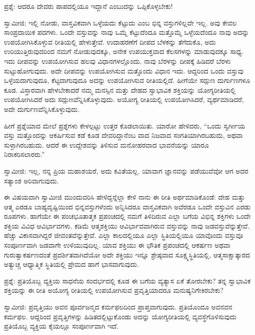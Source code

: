 ಪ್ರಶ್ನೆ: ಆದರೂ ದೇವರು ಪಾಪದಲ್ಲಿಯೂ ಇದ್ದಾನೆ ಎಂಬುದನ್ನು ಒಪ್ಪಿಕೊಳ್ಳಬೇಕು!

ಸ್ವಾಮೀಜಿ: ಇಲ್ಲಿ ನೋಡು, ವಾಸ್ತವಿಕವಾಗಿ ಒಳ್ಳೆಯದು ಕೆಟ್ಟುದು ಎಂಬ ಭಿನ್ನ ವಸ್ತುಗಳಿಲ್ಲವೇ ಇಲ್ಲ. ಅವು ಕೇವಲ ಸಾಂಪ್ರದಾಯಿಕ ಪದಗಳು. ಒಂದೇ ವಸ್ತುವನ್ನು ನಾವು ಒಮ್ಮೆ ಕೆಟ್ಟುದೆಂದೂ ಮತ್ತೊಮ್ಮೆ ಒಳ್ಳೆಯದೆಂದೂ ನಾವು ಅದನ್ನು ಉಪಯೋಗಿಸಿಕೊಳ್ಳುವ ರೀತಿಯಲ್ಲಿ ಹೇಳುತ್ತೇವೆ. ಉದಾಹರಣೆಗೆ ದೀಪದ ಬೆಳಕನ್ನು ತೆಗೆದುಕೊ, ಅದು ಉರಿಯುತ್ತಿರುವುದರಿಂದ ನಮಗೆ ನೋಡುವುದಕ್ಕೂ, ಅನೇಕ ಉಪಯುಕ್ತವಾದ ಕೆಲಸಗಳನ್ನು ಮಾಡುವುದಕ್ಕೂ ಸಾಧ್ಯ. ಇದು ದೀಪವನ್ನು ಉಪಯೋಗಿಸುವ ಹಲವು ವಿಧಾನಗಳಲ್ಲೊಂದು. ನಾವು ಬೆರಳನ್ನು ದೀಪಕ್ಕೆ ಹಿಡಿದರೆ ಬೆರಳು ಸುಟ್ಟುಹೋಗುವುದು. ಅದೇ ದೀಪವನ್ನು ಉಪಯೋಗಿಸುವ ಮತ್ತೊಂದು ವಿಧಾನ ಇದು. ಆದ್ದರಿಂದ ಒಂದು ವಸ್ತುವು ಒಳ್ಳೆಯದಾಗುವುದೂ, ಕೆಟ್ಟದಾಗುವುದೂ ಅದನ್ನು ಉಪಯೋಗಿಸುವ ರೀತಿಯಲ್ಲಿದೆ. ಹೀಗೆಯೇ ಸದ್ಗುಣ ದುರ್ಗುಣಗಳೂ ಕೂಡ. ವಿಸ್ತಾರವಾಗಿ ಹೇಳಬೇಕಾದರೆ ನಮ್ಮ ಮನಸ್ಸಿನ ಮತ್ತು ದೇಹದ ಸ್ವಾಭಾವಿಕ ಶಕ್ತಿಯನ್ನು ಯೋಗ್ಯರೀತಿಯಲ್ಲಿ ಉಪಯೋಗಿಸಿದರೆ ಅದು ಸದ್ಗುಣವೆನ್ನಿಸಿಕೊಳ್ಳುವುದು. ಅಯೋಗ್ಯ ರೀತಿಯಲ್ಲಿ ಉಪಯೋಗಿಸಿದರೆ, ವ್ಯರ್ಥಮಾಡಿದರೆ, ಅದೇ ದುರ್ಗುಣವೆನ್ನಿಸಿಕೊಳ್ಳುವುದು.

ಹೀಗೆ ಪ್ರಶ್ನೆಯಾದ ಮೇಲೆ ಪ್ರಶ್ನೆಗಳು ಕೇಳಲ್ಪಟ್ಟು ಉತ್ತರ ಕೊಡಲಾಯಿತು. ಯಾರೋ ಹೇಳಿದರು, “ಒಂದು ಸ್ವರ್ಗೀಯ ವಸ್ತು ಮತ್ತೊಂದನ್ನು ಆಕರ್ಷಿಸುವ ಕಡೆ ಕೂಡ ದೇವರಿದ್ದಾನೆಂಬ ವಾದ ನಿಜವಾದ ಸಂಗತಿಯಾಗಿರಬಹುದು, ಅಥವಾ ಸುಳ್ಳಾಗಿರಬಹುದು. ಆದರೆ ಈ ಉದ್ದೇಶವನ್ನು ತಿಳಿಸುವ ಮನೋಹರವಾದ ಭಾವನೆಯನ್ನು ಯಾರೂ ನಿರಾಕರಿಸಲಾರರು.”

ಸ್ವಾಮೀಜಿ: ಇಲ್ಲ, ನನ್ನ ಪ್ರಿಯ ಮಹಾಶಯರೆ, ಅದು ಕವಿತೆಯಲ್ಲ. ಯಾವಾಗ ಜ್ಞಾನವನ್ನು ಪಡೆಯುವೆವೋ ಆಗ ಅದರ ಸತ್ಯಾಂಶ ಅರಿವಾಗುವುದು.

ಈ ವಿಷಯವಾಗಿ ಸ್ವಾಮೀಜಿ ಮುಂದುವರಿಸಿ ಹೇಳಿದ್ದನ್ನೆಲ್ಲಾ ಕೇಳಿ ನಾನು ಈ ರೀತಿ ಅರ್ಥಮಾಡಿಕೊಂಡೆ: ದೇಹ ಮತ್ತು ಆತ್ಮ ಎರಡೂ ಬಾಹ್ಯದೃಷ್ಟಿಯಿಂದ ಭಿನ್ನವಸ್ತುಗಳೆಂದು ಅನ್ನಿಸಿದರೂ ವಾಸ್ತವಿಕವಾಗಿ ಅವೆರಡೂ ಒಂದೇ ವಸ್ತುವಿನ ಎರಡು ರೂಪಗಳು. ಹಾಗೆಯೇ ಈ ಪಂಚಭೂತಾತ್ಮಕ ಪ್ರಪಂಚದಲ್ಲಿ ನಮಗೆ ತಿಳಿದಿರುವ ಎಲ್ಲಾ ಬಗೆಯ ವಿಭಿನ್ನ ಶಕ್ತಿಗಳು ಒಂದೇ ಶಕ್ತಿಯ ವಿವಿಧ ಆವಿರ್ಭಾವಗಳು. ಕಡಿಮೆ ಆತ್ಮಶಕ್ತಿಯು ಆವಿರ್ಭಾವವಾಗಿರುವ ವಸ್ತುವನ್ನು ನಾವು ಜಡವಸ್ತುವೆನ್ನುತ್ತೇವೆ. ಹೆಚ್ಚು ವಿಕಾಸವಾಗಿದ್ದರೆ ಜೀವಂತವೆನ್ನುತ್ತೇವೆ. ಎಲ್ಲಾ ಕಾಲದಲ್ಲಿಯೂ ಎಲ್ಲಾ ಸ್ಥಿತಿಯಲ್ಲಿಯೂ ಯಾವೊಂದು ವಸ್ತುವೂ ಸಂಪೂರ್ಣವಾಗಿ ಜಡವಾಗೇ ಉಳಿಯುವುದಿಲ್ಲ. ಯಾವ ಶಕ್ತಿಯು ಈ ಭೌತಿಕ ಪ್ರಪಂಚದಲ್ಲಿ ಆಕರ್ಷಣ ಅಥವಾ ಗುರುತ್ವಾಕರ್ಷಣದಂತೆ ಪ್ರದರ್ಶಿತವಾಗಿದೆಯೋ ಅದೇ ಶಕ್ತಿಯು ಇನ್ನೂ ಶ್ರೇಷ್ಠವಾದ ಸೂಕ್ಷ್ಮಸ್ಥಿತಿಯಲ್ಲಿ, ಆತ್ಮಸಾಕ್ಷಾತ್ಕಾರದ ಅತ್ಯುಚ್ಚ ಆಧ್ಯಾತ್ಮಿಕ ಸ್ಥಿತಿಯಲ್ಲಿ ಪ್ರೇಮದ ಹಾಗೆ ಭಾಸವಾಗುವುದು.

ಪ್ರಶ್ನೆ: ಪ್ರತಿಯೊಬ್ಬ ವ್ಯಕ್ತಿಯ ಸಾಧನೆಯ ಸಂದರ್ಭದಲ್ಲಿ ಕೂಡ ಈ ಬಗೆಯ ವ್ಯತ್ಯಾಸ ಏಕೆ ತೋರಬೇಕು? ತನ್ನ ಸ್ವಾಭಾವಿಕ ಶಕ್ತಿಯನ್ನು ಈ ರೀತಿ ಅಯೋಗ್ಯ ರೀತಿಯಲ್ಲಿ ಉಪಯೋಗಿಸುವ ಪ್ರವೃತ್ತಿಯಾದರೂ ಮನುಷ್ಯನಿಗೇಕಿರಬೇಕು?

ಸ್ವಾಮೀಜಿ: ಪ್ರವೃತ್ತಿಯು ಅವನ ಪೂರ್ವಜನ್ಮದ ಕರ್ಮಫಲದಿಂದ ಪ್ರಾಪ್ತವಾಗುವುದು. ಪ್ರತಿಯೊಂದೂ ಅವನವನ ಕರ್ಮಫಲ. ಆದ್ದರಿಂದ ಪ್ರವೃತ್ತಿಗಳನ್ನು ಹಿಡಿತದಲ್ಲಿಟ್ಟುಕೊಂಡು ಅದನ್ನು ಯೋಗ್ಯರೀತಿಯಲ್ಲಿ ವ್ಯವಸ್ಥೆಗೊಳಿಸುವುದು ಪ್ರತಿಯೊಬ್ಬ ವ್ಯಕ್ತಿಯ ಕೈಯಲ್ಲೂ ಸಂಪೂರ್ಣವಾಗಿ ಇದೆ.

